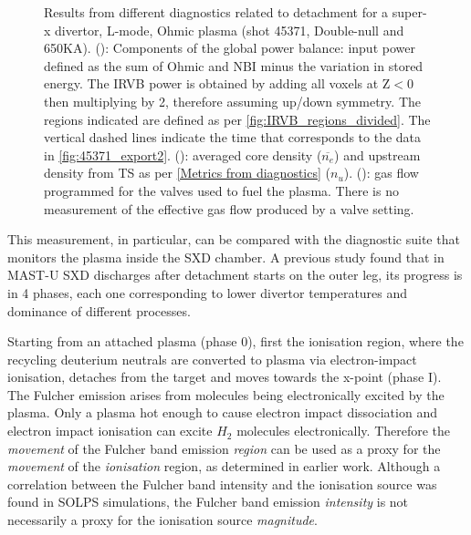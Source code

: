 \begin{figure}[!ht]
\begin{subfigure}{0.8\linewidth}
         \vspace*{-7mm}
         \caption{\phantom{ww}}
         \label{fig:mu01_tomo5c}
     \end{subfigure}
     \vspace*{-3mm}
     \caption{Results from different diagnostics related to detachment for a super-x divertor, L-mode, Ohmic plasma (shot 45371, Double-null and 650KA). (): Components of the global power balance: input power defined as the sum of Ohmic and NBI minus the variation in stored energy. The IRVB power is obtained by adding all voxels at Z$<$0 then multiplying by 2, therefore assuming up/down symmetry. The regions indicated are defined as per \autoref{fig:IRVB_regions_divided}. The vertical dashed lines indicate the time that corresponds to the data in \autoref{fig:45371_export2}. (): averaged core density ($\overline{n_e}$) and upstream density from TS as per \autoref{Metrics from diagnostics} ($n_u$). (): gas flow programmed for the valves used to fuel the plasma. There is no measurement of the effective gas flow produced by a valve setting.}
	\label{fig:mu01_tomo5}
\end{figure}

This measurement, in particular, can be compared with the diagnostic suite that monitors the plasma inside the SXD chamber. A previous study found that in MAST-U SXD discharges after detachment starts on the outer leg, its progress is in 4 phases, each one corresponding to lower divertor temperatures and dominance of different processes.\cite{Verhaegh2022} 

Starting from an attached plasma (phase 0), first the ionisation region, where the recycling deuterium neutrals are converted to plasma via electron-impact ionisation, detaches from the target and moves towards the x-point (phase I). The Fulcher emission arises from molecules being electronically excited by the plasma. Only a plasma hot enough to cause electron impact dissociation and electron impact ionisation can excite $H_2$ molecules electronically. Therefore the \emph{movement} of the Fulcher band emission \emph{region} can be used as a proxy for the \emph{movement} of the \emph{ionisation} region, as determined in earlier work. \cite{Verhaegh2020} Although a correlation between the Fulcher band intensity and the ionisation source was found in SOLPS simulations, the Fulcher band emission \emph{intensity} is not necessarily a proxy for the ionisation source \emph{magnitude}.

